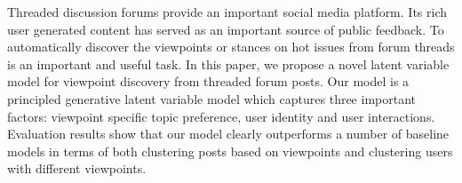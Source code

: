 Threaded discussion forums provide an important social media platform. Its rich user generated content has served as an important source of public feedback. To
 automatically discover the viewpoints or stances on hot issues from forum
 threads is an important and useful task. In this paper, we propose a novel
 latent variable model for viewpoint discovery from threaded forum posts. Our
 model is a principled generative latent variable model which captures three
 important factors: viewpoint specific topic preference, user identity and user
 interactions. Evaluation results show that our model clearly outperforms a
 number of baseline models in terms of both clustering posts based on viewpoints
 and clustering users with different viewpoints.

